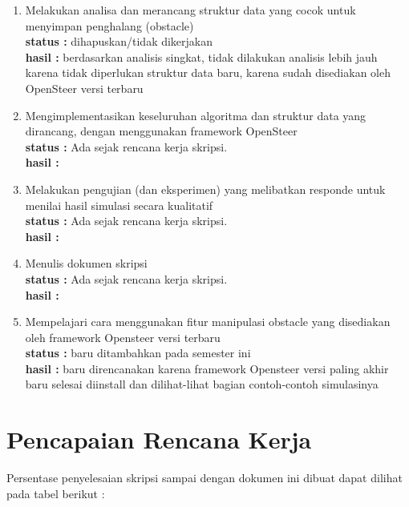 \documentclass[a4paper,twoside]{article}
\begin{document}
\begin{enumerate}
		\item Melakukan analisa dan merancang struktur data yang cocok untuk menyimpan penghalang (obstacle)\\
		{\bf status :} dihapuskan/tidak dikerjakan \\
		{\bf hasil :} berdasarkan analisis singkat, tidak dilakukan analisis lebih jauh karena tidak diperlukan struktur data baru, karena sudah disediakan oleh OpenSteer versi terbaru

		\item Mengimplementasikan keseluruhan algoritma dan struktur data yang dirancang, dengan menggunakan framework OpenSteer \\
		{\bf status :} Ada sejak rencana kerja skripsi.\\
		{\bf hasil :}

		\item Melakukan pengujian (dan eksperimen) yang melibatkan responde untuk menilai hasil simulasi secara kualitatif\\
		{\bf status :} Ada sejak rencana kerja skripsi.\\
		{\bf hasil :}

		\item Menulis dokumen skripsi\\
		{\bf status :} Ada sejak rencana kerja skripsi.\\
		{\bf hasil :} \lipsum[1]
		
		\item Mempelajari cara menggunakan fitur manipulasi obstacle yang disediakan oleh framework Opensteer versi terbaru\\
		{\bf status :} baru ditambahkan pada semester ini\\
		{\bf hasil :} baru direncanakan karena framework Opensteer versi paling akhir baru selesai diinstall dan dilihat-lihat bagian contoh-contoh simulasinya
		

	\end{enumerate}

\section{Pencapaian Rencana Kerja}
Persentase penyelesaian skripsi sampai dengan dokumen ini dibuat dapat dilihat pada tabel berikut :
\end{document}
